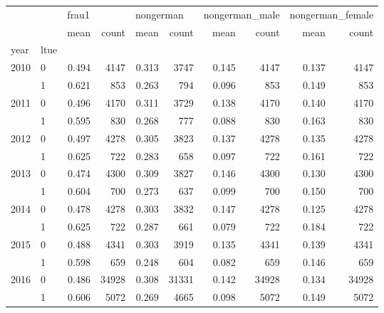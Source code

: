 \begin{tabular}{llrrrrrrrr}
\toprule
     &   & \multicolumn{2}{l}{frau1} & \multicolumn{2}{l}{nongerman} & \multicolumn{2}{l}{nongerman\_male} & \multicolumn{2}{l}{nongerman\_female} \\
     &   &  mean &  count &      mean &  count &           mean &  count &             mean &  count \\
year & ltue &       &        &           &        &                &        &                  &        \\
\midrule
2010 & 0 & 0.494 &   4147 &     0.313 &   3747 &          0.145 &   4147 &            0.137 &   4147 \\
     & 1 & 0.621 &    853 &     0.263 &    794 &          0.096 &    853 &            0.149 &    853 \\
2011 & 0 & 0.496 &   4170 &     0.311 &   3729 &          0.138 &   4170 &            0.140 &   4170 \\
     & 1 & 0.595 &    830 &     0.268 &    777 &          0.088 &    830 &            0.163 &    830 \\
2012 & 0 & 0.497 &   4278 &     0.305 &   3823 &          0.137 &   4278 &            0.135 &   4278 \\
     & 1 & 0.625 &    722 &     0.283 &    658 &          0.097 &    722 &            0.161 &    722 \\
2013 & 0 & 0.474 &   4300 &     0.309 &   3827 &          0.146 &   4300 &            0.130 &   4300 \\
     & 1 & 0.604 &    700 &     0.273 &    637 &          0.099 &    700 &            0.150 &    700 \\
2014 & 0 & 0.478 &   4278 &     0.303 &   3832 &          0.147 &   4278 &            0.125 &   4278 \\
     & 1 & 0.625 &    722 &     0.287 &    661 &          0.079 &    722 &            0.184 &    722 \\
2015 & 0 & 0.488 &   4341 &     0.303 &   3919 &          0.135 &   4341 &            0.139 &   4341 \\
     & 1 & 0.598 &    659 &     0.248 &    604 &          0.082 &    659 &            0.146 &    659 \\
2016 & 0 & 0.486 &  34928 &     0.308 &  31331 &          0.142 &  34928 &            0.134 &  34928 \\
     & 1 & 0.606 &   5072 &     0.269 &   4665 &          0.098 &   5072 &            0.149 &   5072 \\
\bottomrule
\end{tabular}
